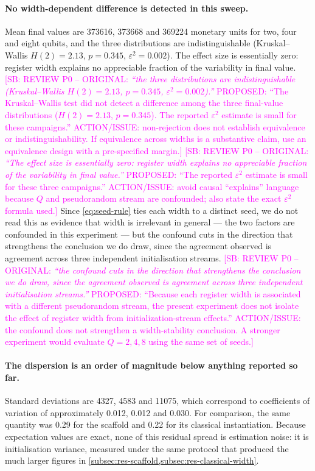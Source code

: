 \documentclass[aps,floatfix,superscriptaddress,twocolumn,tightenlines,amsmath,amssymb,nofootinbib,10pt,longbibliography,prl]{revtex4-2}
\newcommand{\sam}[1]{\textcolor{magenta}{[SB: {#1}]}}
\begin{document}
\paragraph{No width-dependent difference is detected in this sweep.} Mean final values
are \num{373616}, \num{373668} and \num{369224} monetary units for two, four and eight qubits, and the three distributions are indistinguishable (Kruskal--Wallis $H(2) = 2.13$, $p = 0.345$, $\varepsilon^2 = 0.002$). The effect size is essentially zero: register width explains no appreciable fraction of the variability in final value.
\sam{REVIEW P0 -- ORIGINAL: \textit{``the three distributions are indistinguishable (Kruskal--Wallis $H(2)=2.13$, $p=0.345$, $\varepsilon^2=0.002$).''} PROPOSED: ``The Kruskal--Wallis test did not detect a difference among the three final-value distributions ($H(2)=2.13$, $p=0.345$). The reported $\varepsilon^2$ estimate is small for these campaigns.'' ACTION/ISSUE: non-rejection does not establish equivalence or indistinguishability. If equivalence across widths is a substantive claim, use an equivalence design with a pre-specified margin.}
\sam{REVIEW P0 -- ORIGINAL: \textit{``The effect size is essentially zero: register width explains no appreciable fraction of the variability in final value.''} PROPOSED: ``The reported $\varepsilon^2$ estimate is small for these three campaigns.'' ACTION/ISSUE: avoid causal ``explains'' language because $Q$ and pseudorandom stream are confounded; also state the exact $\varepsilon^2$ formula used.} Since \ref{eq:seed-rule} ties each width to a distinct seed, we do not read this as evidence that width is irrelevant in general --- the two factors are confounded in this experiment --- but the confound cuts in the direction that strengthens the conclusion we do draw, since the agreement observed is agreement across three independent initialisation streams.
\sam{REVIEW P0 -- ORIGINAL: \textit{``the confound cuts in the direction that strengthens the conclusion we do draw, since the agreement observed is agreement across three independent initialisation streams.''} PROPOSED: ``Because each register width is associated with a different pseudorandom stream, the present experiment does not isolate the effect of register width from initialization-stream effects.'' ACTION/ISSUE: the confound does not strengthen a width-stability conclusion. A stronger experiment would evaluate $Q=2,4,8$ using the same set of seeds.}

\paragraph{The dispersion is an order of magnitude below anything reported so
far.} Standard deviations are \num{4327}, \num{4583} and \num{11075}, which correspond to coefficients of variation of approximately \num{0.012}, \num{0.012} and \num{0.030}. For comparison, the same quantity was \num{0.29} for the scaffold and \num{0.22} for its classical instantiation. Because expectation values are exact, none of this residual spread is estimation noise: it is initialisation variance, measured under the same protocol that produced the much larger figures in \ref{subsec:res-scaffold,subsec:res-classical-width}.
\end{document}
